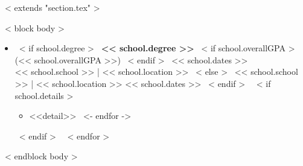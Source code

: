 ~< extends "section.tex" >~

~< block body >~
\vspace{-2mm}
\begin{itemize}
~< for school in items >~
\item
  ~< if school.degree >~
    \textbf{<< school.degree >>}
    ~< if school.overallGPA >~
        (<< school.overallGPA >>)
    ~< endif >~
    \hfill << school.dates >> \\
    << school.school >> | << school.location >>
  ~< else >~
    << school.school >> | << school.location >> \hfill << school.dates >>
  ~< endif >~
  ~< if school.details >~
    \begin{itemize}
    ~< for detail in school.details ->~
        \item <<detail>>
    ~<- endfor ->~
    \end{itemize}
  ~< endif >~
  \vspace{3mm}
~< endfor >~
\end{itemize}
\vspace{-3mm}
~< endblock body >~
